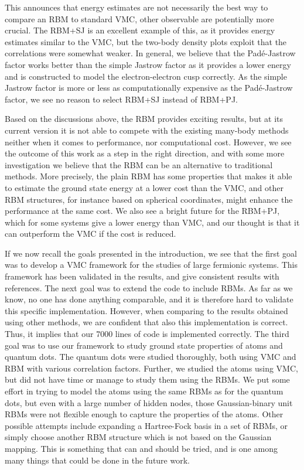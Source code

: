 This announces that energy estimates are not necessarily the best way to compare an RBM to standard VMC, other observable are potentially more crucial. The RBM+SJ is an excellent example of this, as it provides energy estimates similar to the VMC, but the two-body density plots exploit that the correlations were somewhat weaker. In general, we believe that the Padé-Jastrow factor works better than the simple Jastrow factor as it provides a lower energy and is constructed to model the electron-electron cusp correctly. As the simple Jastrow factor is more or less as computationally expensive as the Padé-Jastrow factor, we see no reason to select RBM+SJ instead of RBM+PJ.

Based on the discussions above, the RBM provides exciting results, but at its current version it is not able to compete with the existing many-body methods neither when it comes to performance, nor computational cost. However, we see the outcome of this work as a step in the right direction, and with some more investigation we believe that the RBM can be an alternative to traditional methods. More precisely, the plain RBM has some properties that makes it able to estimate the ground state energy at a lower cost than the VMC, and other RBM structures, for instance based on spherical coordinates, might enhance the performance at the same cost. We also see a bright future for the RBM+PJ, which for some systems give a lower energy than VMC, and our thought is that it can outperform the VMC if the cost is reduced.

If we now recall the goals presented in the introduction, we see that the first goal was to develop a VMC framework for the studies of large fermionic systems. This framework has been validated in the results, and give consistent results with references. The next goal was to extend the code to include RBMs. As far as we know, no one has done anything comparable, and it is therefore hard to validate this specific implementation. However, when comparing to the results obtained using other methods, we are confident that also this implementation is correct. Thus, it implies that our 7000 lines of code is implemented correctly. The third goal was to use our framework to study ground state properties of atoms and quantum dots. The quantum dots were studied thoroughly, both using VMC and RBM with various correlation factors. Further, we studied the atoms using VMC, but did not have time or manage to study them using the RBMs. We put some effort in trying to model the atoms using the same RBMs as for the quantum dots, but even with a large number of hidden nodes, those Gaussian-binary unit RBMs were not flexible enough to capture the properties of the atoms. Other possible attempts include expanding a Hartree-Fock basis in a set of RBMs, or simply choose another RBM structure which is not based on the Gaussian mapping. This is something that can and should be tried, and is one among many things that could be done in the future work. 

